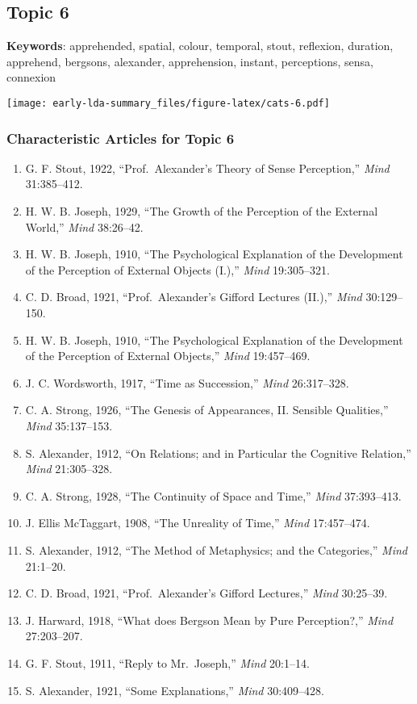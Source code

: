 \documentclass[
]{article}
\begin{document}
\newpage

\hypertarget{topic-6}{%
\subsection{Topic 6}\label{topic-6}}

\textbf{Keywords}: apprehended, spatial, colour, temporal, stout,
reflexion, duration, apprehend, bergsons, alexander, apprehension,
instant, perceptions, sensa, connexion

\texttt{[image: early-lda-summary\_files/figure-latex/cats-6.pdf]}
\newpage 

\hypertarget{characteristic-articles-for-topic-6}{%
\subsubsection{Characteristic Articles for Topic
6}\label{characteristic-articles-for-topic-6}}

\begin{enumerate}
\def\labelenumi{\arabic{enumi}.}
\item
  G. F. Stout, 1922, ``Prof.~Alexander's Theory of Sense Perception,''
  \emph{Mind} 31:385--412.
\item
  H. W. B. Joseph, 1929, ``The Growth of the Perception of the External
  World,'' \emph{Mind} 38:26--42.
\item
  H. W. B. Joseph, 1910, ``The Psychological Explanation of the
  Development of the Perception of External Objects (I.),'' \emph{Mind}
  19:305--321.
\item
  C. D. Broad, 1921, ``Prof.~Alexander's Gifford Lectures (II.),''
  \emph{Mind} 30:129--150.
\item
  H. W. B. Joseph, 1910, ``The Psychological Explanation of the
  Development of the Perception of External Objects,'' \emph{Mind}
  19:457--469.
\item
  J. C. Wordsworth, 1917, ``Time as Succession,'' \emph{Mind}
  26:317--328.
\item
  C. A. Strong, 1926, ``The Genesis of Appearances, II. Sensible
  Qualities,'' \emph{Mind} 35:137--153.
\item
  S. Alexander, 1912, ``On Relations; and in Particular the Cognitive
  Relation,'' \emph{Mind} 21:305--328.
\item
  C. A. Strong, 1928, ``The Continuity of Space and Time,'' \emph{Mind}
  37:393--413.
\item
  J. Ellis McTaggart, 1908, ``The Unreality of Time,'' \emph{Mind}
  17:457--474.
\item
  S. Alexander, 1912, ``The Method of Metaphysics; and the Categories,''
  \emph{Mind} 21:1--20.
\item
  C. D. Broad, 1921, ``Prof.~Alexander's Gifford Lectures,'' \emph{Mind}
  30:25--39.
\item
  J. Harward, 1918, ``What does Bergson Mean by Pure Perception?,''
  \emph{Mind} 27:203--207.
\item
  G. F. Stout, 1911, ``Reply to Mr.~Joseph,'' \emph{Mind} 20:1--14.
\item
  S. Alexander, 1921, ``Some Explanations,'' \emph{Mind} 30:409--428.
\end{enumerate}
\end{document}
